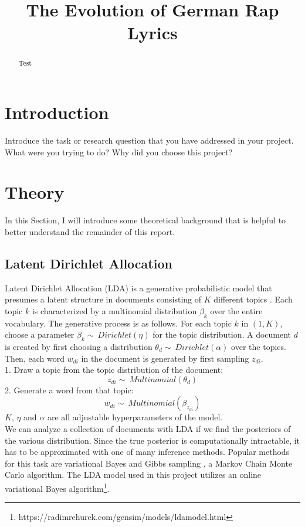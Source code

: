 \documentclass[conference]{IEEEtran}
\begin{document}
\title{The Evolution of German Rap Lyrics}


\author{
}

\maketitle

\begin{abstract}
Test
\end{abstract}

\section{Introduction}
Introduce the task or research question that you have addressed in
your project. What were you trying to do? Why did you choose this project?

\section{Theory}
In this Section, I will introduce some theoretical background that is helpful to better understand the remainder of this report.
\subsection{Latent Dirichlet Allocation}
Latent Dirichlet Allocation (LDA) is a generative probabilistic model that presumes a latent structure in documents consisting of $K$ different topics \cite{hoffman}. Each topic $k$ is characterized by a multinomial distribution $\beta_k$ over the entire vocabulary. The generative process is as follows. For each topic $k$ in $(1,K)$, choose a parameter ${\beta_k \sim\ Dirichlet(\eta)}$ for the topic distribution. A document $d$ is created by first choosing a distribution ${\theta_d \sim\ Dirichlet(\alpha)}$ over the topics. Then, each word $w_{di}$ in the document is generated by first sampling $z_{di}$.\\
1. Draw a topic from the topic distribution of the document:
$${z_{di} \sim\ Multinomial(\theta_d)}$$
2. Generate a word from that topic:
$${w_{di} \sim\ Multinomial(\beta_{z_{di}})}$$
$K$, $\eta$ and $\alpha$ are all adjustable hyperparameters of the model.\\
We can analyze a collection of documents with LDA if we find the posteriors of the various distribution. Since the true posterior is computationally intractable, it has to be approximated with one of many inference methods. Popular methods for this task are variational Bayes \cite{blei} and Gibbs sampling \cite{griffiths}, a Markov Chain Monte Carlo algorithm. The LDA model used in this project utilizes an online variational Bayes algorithm\footnote{https://radimrehurek.com/gensim/models/ldamodel.html}.
\end{document}
